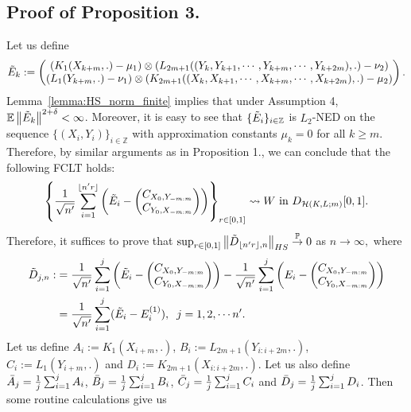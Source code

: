 \documentclass[11pt]{article}
\newcommand{\bE}{\mathbb{E}}
\newcommand{\bP}{\mathbb{P}}
\theoremstyle{plain}
\theoremstyle{definition}
\theoremstyle{remark}
\begin{document}
\begin{appendix}
        \subsection{Proof of Proposition 3.}
        Let us define
$$\Tilde{E}_k:=\begin{pmatrix}
    (K_1(X_{k+m},.)-\mu_1)\otimes (L_{2m+1}((Y_{k},Y_{k+1},\cdots,Y_{k+m},\cdots, Y_{k+2m}),.)-\nu_{2})\\
    (L_1(Y_{k+m},.)-\nu_1)\otimes (K_{2m+1}((X_{k},X_{k+1},\cdots,X_{k+m},\cdots, X_{k+2m}),.)-\mu_{2})
\end{pmatrix}.$$
 Lemma~\ref{lemma:HS_norm_finite} implies that under Assumption 4, $\bE \left\|\Tilde{E}_k\right\|^{2+\delta}<\infty$. Moreover, it is easy to see that $\{\Tilde{E}_i\}_{i \in \mathbb{Z}}$ is $L_2$-NED on the sequence $\{(X_i, Y_i)\}_{i \in \mathbb{Z}}$ with approximation constants $\mu_k=0$ for all $k\geq m$. Therefore, by similar arguments as in Proposition 1., we can conclude that the following FCLT holds:
$$\left\{\frac{1}{\sqrt{n'}}\sum_{i=1}^{\lfloor n'r\rfloor}\left(\Tilde{E}_i-\begin{pmatrix}
    C_{X_0,Y_{-m:m}}\\
    C_{Y_0,X_{-m:m}}
\end{pmatrix}\right)\right\}_{r \in [0,1]}\leadsto W \text{ in } D_{\mathcal{H}(K,L;m)}[0,1].$$
Therefore, it suffices to prove that $\sup_{r \in [0,1]}\left\| \Tilde{D}_{\lfloor n'r \rfloor, n}\right\|_{HS}\overset{\bP}{\to} 0$ as $n\to \infty,$ where
\begin{align*}
    \Tilde{D}_{j,n}:&=\frac{1}{\sqrt{n'}}\sum_{i=1}^{j}\left(\Tilde{E}_i-\begin{pmatrix}
    C_{X_0,Y_{-m:m}}\\
    C_{Y_0,X_{-m:m}}
\end{pmatrix}\right)-\frac{1}{\sqrt{n'}}\sum_{i=1}^{j}\left(E_i-\begin{pmatrix}
    C_{X_0,Y_{-m:m}}\\
    C_{Y_0,X_{-m:m}}
\end{pmatrix}\right)\\
    &=\frac{1}{\sqrt{n'}}\sum_{i=1}^{j}(\Tilde{E}_i-E^{(1)}_i),\;\;j=1,2,\cdots n'.
\end{align*}
Let us define $A_i:=K_1(X_{i+m},.)$, $B_i:=L_{2m+1}(Y_{i:i+2m},.)$, $C_i:=L_1(Y_{i+m},.)$ and \newline \noindent $D_i:=K_{2m+1}(X_{i:i+2m},.)$. Let us also define $\Bar{A}_j=\frac{1}{j}\sum_{i=1}^j A_i$, $\Bar{B}_j=\frac{1}{j}\sum_{i=1}^j B_i$, $\Bar{C}_j=\frac{1}{j}\sum_{i=1}^j C_i$ and $\Bar{D}_j=\frac{1}{j}\sum_{i=1}^j D_i$. Then some routine calculations give us

\end{appendix}
\end{document}
